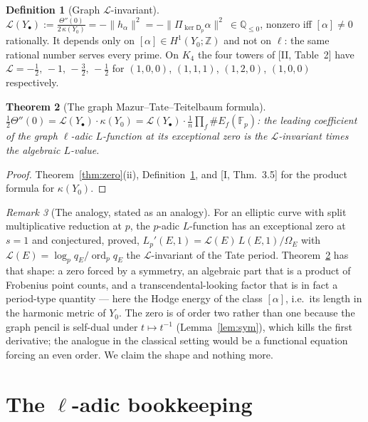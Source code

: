 \documentclass[11pt]{amsart}
\numberwithin{equation}{section}
\newtheorem{theorem}{Theorem}[section]
\theoremstyle{definition}
\newtheorem{definition}[theorem]{Definition}
\theoremstyle{remark}
\newtheorem{remark}[theorem]{Remark}
\newcommand{\Z}{\mathbb{Z}}
\newcommand{\Q}{\mathbb{Q}}
\newcommand{\F}{\mathbb{F}}
\newcommand{\cL}{\mathcal{L}}
\newcommand{\ord}{\operatorname{ord}}
\begin{document}
\begin{definition}[Graph $\cL$-invariant]\label{def:L}
$\displaystyle\cL(Y_\bullet):=\frac{\Theta''(0)}{2\,\kappa(Y_0)}=-\|h_\alpha\|^{2}
=-\|\Pi_{\ker\mathsf D_p}\alpha\|^{2}\ \in\Q_{\le0}$, nonzero iff $[\alpha]\neq0$
rationally. It depends only on $[\alpha]\in H^{1}(Y_0;\Z)$ and not on $\ell$: the same
rational number serves every prime. On $K_4$ the four towers of [II, Table~2] have
$\cL=-\frac12,\,-1,\,-\frac32,\,-\frac12$ for $(1,0,0)$, $(1,1,1)$, $(1,2,0)$, $(1,0,0)$
respectively.
\end{definition}

\begin{theorem}[The graph Mazur--Tate--Teitelbaum formula]\label{thm:mtt}
$\displaystyle\tfrac12\Theta''(0)=\cL(Y_\bullet)\cdot\kappa(Y_0)
=\cL(Y_\bullet)\cdot\frac1n\prod_f\#E_f(\F_p)$: the leading coefficient of the graph
$\ell$-adic $L$-function at its exceptional zero is the $\cL$-invariant times the
algebraic $L$-value.
\end{theorem}

\begin{proof}
Theorem~\ref{thm:zero}(ii), Definition~\ref{def:L}, and [I, Thm.~3.5] for the product
formula for $\kappa(Y_0)$.
\end{proof}

\begin{remark}[The analogy, stated as an analogy]\label{rem:analogy}
For an elliptic curve with split multiplicative reduction at $p$, the $p$-adic
$L$-function has an exceptional zero at $s=1$ and \cite{MTT} conjectured, \cite{GS}
proved, $L_p'(E,1)=\cL(E)\,L(E,1)/\Omega_E$ with $\cL(E)=\log_pq_E/\ord_pq_E$ the
$\cL$-invariant of the Tate period. Theorem~\ref{thm:mtt} has that shape: a zero forced
by a symmetry, an algebraic part that is a product of Frobenius point counts, and a
transcendental-looking factor that is in fact a period-type quantity --- here the Hodge
energy of the class $[\alpha]$, i.e.\ its length in the harmonic metric of $Y_0$. The
zero is of order two rather than one because the graph pencil is self-dual under
$t\mapsto t^{-1}$ (Lemma~\ref{lem:sym}), which kills the first derivative; the analogue
in the classical setting would be a functional equation forcing an even order. We
claim the shape and nothing more.
\end{remark}

\section{The $\ell$-adic bookkeeping}\label{sec:book}
\end{document}

